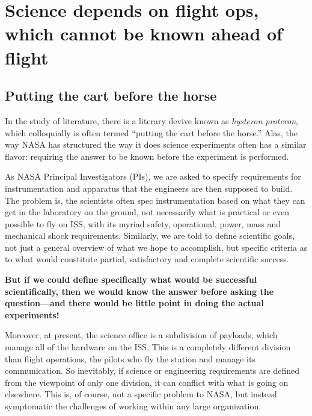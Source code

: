 \section{Science depends on flight ops, which cannot be known ahead of flight}\hypertarget{science-depends-on-flight-ops-which-cannot-be-known-ahead-of-flight}{}\label{science-depends-on-flight-ops-which-cannot-be-known-ahead-of-flight}

\subsection{Putting the cart before the horse}\hypertarget{putting-the-cart-before-the-horse}{}\label{putting-the-cart-before-the-horse}
In the study of literature, there is a literary devive known as \emph{hysteron
proteron}, which colloquially is often termed ``putting the cart before the
horse.'' Alas, the way NASA has structured the way it does science experiments
often has a similar flavor: requiring the answer to be known before the
experiment is performed.

As NASA Principal Investigators (PIs), we are asked to specify requirements for
instrumentation and apparatus that the engineers are then supposed to build. The
problem is, the scientists often spec instrumentation based on what they can get
in the laboratory on the ground, not necessarily what is practical or even
possible to fly on ISS, with its myriad safety, operational, power, mass and
mechanical shock requirements. Similarly, we are told to define scientific
goals, not just a general overview of what we hope to accomplish, but specific
criteria as to what would constitute partial, satisfactory and complete
scientific success.

\textbf{But if we could define specifically what would be successful scientifically, then we would know the answer before asking the question---and there would be little point in doing the actual experiments!}

Moreover, at present, the science office is a subdivision of payloads, which
manage all of the hardware on the ISS. This is a completely different division
than flight operations, the pilots who fly the station and manage its
communication. So inevitably, if science or engineering requirements are defined
from the viewpoint of only one division, it can conflict with what is going on
elsewhere. This is, of course, not a specific problem to NASA, but instead
symptomatic the challenges of working within any large organization.

